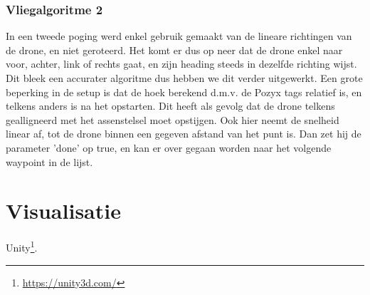 \subsubsection{Vliegalgoritme 2}
In een tweede poging werd enkel gebruik gemaakt van de lineare richtingen van de drone, en niet geroteerd.
Het komt er dus op neer dat de drone enkel naar voor, achter, link of rechts gaat, en zijn heading steeds in dezelfde richting wijst.
Dit bleek een accurater algoritme dus hebben we dit verder uitgewerkt.
Een grote beperking in de setup is dat de hoek berekend d.m.v. de Pozyx tags relatief is, en telkens anders is na het opstarten.
Dit heeft als gevolg dat de drone telkens gealligneerd met het assenstelsel moet opstijgen.
Ook hier neemt de snelheid linear af, tot de drone binnen een gegeven afstand van het punt is.
Dan zet hij de parameter 'done' op true, en kan er over gegaan worden naar het volgende waypoint in de lijst.

\section{Visualisatie} \label{sec:visualization}
Unity\footnote{\url{https://unity3d.com/}}.